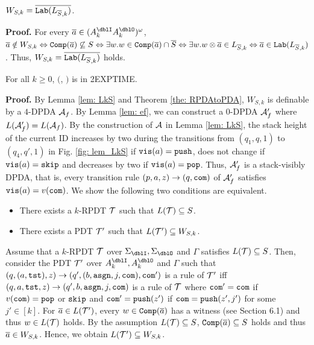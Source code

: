 \begin{lemma} \label{lem: W=lab}
$W_{S,k} = \overline{\mathtt{Lab}(L_{{\overline{S}},k})}$.
\end{lemma}
{\bf Proof.}\quad
For every $\overa\in(A_k^\dblI A_k^\dblO)^\omega$,
${\overline{a}}\notin W_{S,k} \Leftrightarrow {\mathtt{Comp}}({\overline{a}})\not\subseteq S
\Leftrightarrow \exists w. w\in {\mathtt{Comp}}({\overline{a}})\cap {\overline{S}}
\Leftrightarrow \exists w. w\otimes{\overline{a}}\in L_{{\overline{S}},k}
\Leftrightarrow {\overline{a}}\in\mathtt{Lab}(L_{{\overline{S}},k})$.
Thus, $W_{S,k} = \overline{\mathtt{Lab}(L_{{\overline{S}},k})}$ holds.

\begin{theorem}
\label{th: DPDAv}
For all $k\geq 0$, \Real $($\DRPDAv, \RPDTk$)$ is in 2EXPTIME.
\end{theorem}
{\bf Proof.}\quad
By Lemma \ref{lem: LkS} and Theorem \ref{the: RPDAtoPDA},
$W_{S,k}$ is definable by a $4$-DPDA ${\cal A}_f$.
By Lemma \ref{lem: ef}, we can construct a $0$-DPDA ${\cal A}'_f$
where $L({\cal A}_f')=L({\cal A}_f)$.
By the construction of ${\cal A}$ in Lemma \ref{lem: LkS},
the stack height of the current ID increases by two during the transitions
from $(q_1,q,1)$ to $(q_4,q',1)$ in Fig. \ref{fig: lem_LkS} if $\mathtt{vis}(a)=\mathtt{push}$,
does not change if $\mathtt{vis}(a)=\mathtt{skip}$ and
decreases by two if $\mathtt{vis}(a)=\mathtt{pop}$.
Thus, ${\cal A}'_f$ is a stack-visibly DPDA,
that is, every transition rule $(p,a,z)\to(q,\mathtt{com})$ of ${\cal A}'_f$
satisfies $\mathtt{vis}(a)=v(\mathtt{com})$.
We show the following two conditions are equivalent.
\begin{itemize}
\item There exists a $k$-RPDT ${\cal T}$ such that $L({\cal T})\subseteq S$.
\item There exists a PDT ${\cal T}'$ such that $L({\cal T}')\subseteq W_{S,k}$.
\end{itemize}
Assume that a $k$-RPDT ${\cal T}$ over $\Sigma_\dblI,\Sigma_\dblO$ and $\Gamma$ satisfies $L({\cal T})\subseteq S$.
Then, consider the PDT ${\cal T}'$ over $A_k^\dblI,A_k^\dblO$ and $\Gamma$ such that
$(q,(a,\mathtt{tst}),z)\to(q',(b,\mathtt{asgn},j,\mathtt{com}),\mathtt{com}')$ is a rule of ${\cal T}'$
iff $(q,a,\mathtt{tst},z)\to(q',b,\mathtt{asgn},j,\mathtt{com})$ is a rule of ${\cal T}$ where $\mathtt{com}'=\mathtt{com}$ if $v(\mathtt{com})=\mathtt{pop}$ or $\mathtt{skip}$ and $\mathtt{com}'=\mathtt{push}(z')$ if $\mathtt{com}=\mathtt{push}(z',j')$ for some $j'\in[k]$.
For ${\overline{a}}\in L({\cal T}')$, every $w\in{\mathtt{Comp}}({\overline{a}})$
has a witness (see Section 6.1) and thus $w\in L({\cal T})$ holds.
By the assumption $L({\cal T})\subseteq S$,
${\mathtt{Comp}}({\overline{a}})\subseteq S$ holds and thus ${\overline{a}}\in W_{S,k}$.
Hence, we obtain $L({\cal T}')\subseteq W_{S,k}$.

